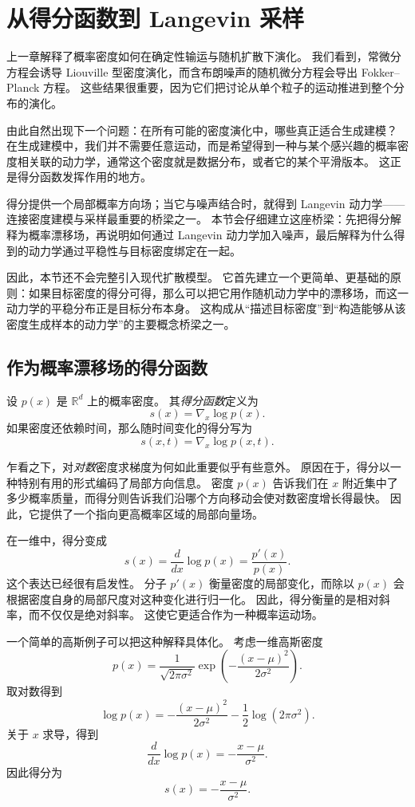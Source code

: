 \section{从得分函数到 Langevin 采样}

上一章解释了概率密度如何在确定性输运与随机扩散下演化。
我们看到，常微分方程会诱导 Liouville 型密度演化，而含布朗噪声的随机微分方程会导出 Fokker--Planck 方程。
这些结果很重要，因为它们把讨论从单个粒子的运动推进到整个分布的演化。

由此自然出现下一个问题：在所有可能的密度演化中，哪些真正适合生成建模？
在生成建模中，我们并不需要任意运动，而是希望得到一种与某个感兴趣的概率密度相关联的动力学，通常这个密度就是数据分布，或者它的某个平滑版本。
这正是得分函数发挥作用的地方。

得分提供一个局部概率方向场；当它与噪声结合时，就得到 Langevin 动力学——连接密度建模与采样最重要的桥梁之一。
本节会仔细建立这座桥梁：先把得分解释为概率漂移场，再说明如何通过 Langevin 动力学加入噪声，最后解释为什么得到的动力学通过平稳性与目标密度绑定在一起。

因此，本节还不会完整引入现代扩散模型。
它首先建立一个更简单、更基础的原则：如果目标密度的得分可得，那么可以把它用作随机动力学中的漂移场，而这一动力学的平稳分布正是目标分布本身。
这构成从“描述目标密度”到“构造能够从该密度生成样本的动力学”的主要概念桥梁之一。

\subsection{作为概率漂移场的得分函数}

设 $p(x)$ 是 $\mathbb{R}^d$ 上的概率密度。
其\emph{得分函数}定义为
\[
s(x)=\nabla_x \log p(x).
\]
如果密度还依赖时间，那么随时间变化的得分写为
\[
s(x,t)=\nabla_x \log p(x,t).
\]

乍看之下，对\emph{对数}密度求梯度为何如此重要似乎有些意外。
原因在于，得分以一种特别有用的形式编码了局部方向信息。
密度 $p(x)$ 告诉我们在 $x$ 附近集中了多少概率质量，而得分则告诉我们沿哪个方向移动会使对数密度增长得最快。
因此，它提供了一个指向更高概率区域的局部向量场。

在一维中，得分变成
\[
s(x)
=
\frac{d}{dx}\log p(x)
=
\frac{p'(x)}{p(x)}.
\]
这个表达已经很有启发性。
分子 $p'(x)$ 衡量密度的局部变化，而除以 $p(x)$ 会根据密度自身的局部尺度对这种变化进行归一化。
因此，得分衡量的是相对斜率，而不仅仅是绝对斜率。
这使它更适合作为一种概率运动场。

一个简单的高斯例子可以把这种解释具体化。
考虑一维高斯密度
\[
p(x)
=
\frac{1}{\sqrt{2\pi\sigma^2}}
\exp\left(
-\frac{(x-\mu)^2}{2\sigma^2}
\right).
\]
取对数得到
\[
\log p(x)
=
-\frac{(x-\mu)^2}{2\sigma^2}
-\frac{1}{2}\log(2\pi\sigma^2).
\]
关于 $x$ 求导，得到
\[
\frac{d}{dx}\log p(x)
=
-\frac{x-\mu}{\sigma^2}.
\]
因此得分为
\[
\boxed{
s(x)
=
-\frac{x-\mu}{\sigma^2}.
}
\]

